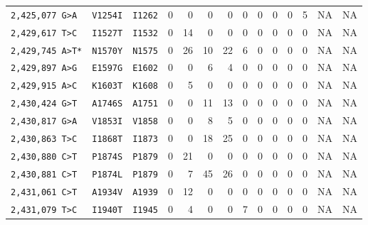 \begin{tabular}{lllrrrrrrrrrrr}
\texttt{2,425,077 G>A} & \texttt{V1254I} & \texttt{I1262} & 0 & 0 & 0 & 0 & 0 & 0 & 0 & 0 & 5 & NA & NA \\

\texttt{2,429,617 T>C} & \texttt{I1527T} & \texttt{I1532} & 0 & 14 & 0 & 0 & 0 & 0 & 0 & 0 & 0 & NA & NA \\

\texttt{2,429,745 A>T*} & \texttt{N1570Y} & \texttt{N1575} & 0 & 26 & 10 & 22 & 6 & 0 & 0 & 0 & 0 & NA & NA \\

\texttt{2,429,897 A>G} & \texttt{E1597G} & \texttt{E1602} & 0 & 0 & 6 & 4 & 0 & 0 & 0 & 0 & 0 & NA & NA \\

\texttt{2,429,915 A>C} & \texttt{K1603T} & \texttt{K1608} & 0 & 5 & 0 & 0 & 0 & 0 & 0 & 0 & 0 & NA & NA \\

\texttt{2,430,424 G>T} & \texttt{A1746S} & \texttt{A1751} & 0 & 0 & 11 & 13 & 0 & 0 & 0 & 0 & 0 & NA & NA \\

\texttt{2,430,817 G>A} & \texttt{V1853I} & \texttt{V1858} & 0 & 0 & 8 & 5 & 0 & 0 & 0 & 0 & 0 & NA & NA \\

\texttt{2,430,863 T>C} & \texttt{I1868T} & \texttt{I1873} & 0 & 0 & 18 & 25 & 0 & 0 & 0 & 0 & 0 & NA & NA \\

\texttt{2,430,880 C>T} & \texttt{P1874S} & \texttt{P1879} & 0 & 21 & 0 & 0 & 0 & 0 & 0 & 0 & 0 & NA & NA \\

\texttt{2,430,881 C>T} & \texttt{P1874L} & \texttt{P1879} & 0 & 7 & 45 & 26 & 0 & 0 & 0 & 0 & 0 & NA & NA \\

\texttt{2,431,061 C>T} & \texttt{A1934V} & \texttt{A1939} & 0 & 12 & 0 & 0 & 0 & 0 & 0 & 0 & 0 & NA & NA \\

\texttt{2,431,079 T>C} & \texttt{I1940T} & \texttt{I1945} & 0 & 4 & 0 & 0 & 7 & 0 & 0 & 0 & 0 & NA & NA \\

\bottomrule
\end{tabular}

